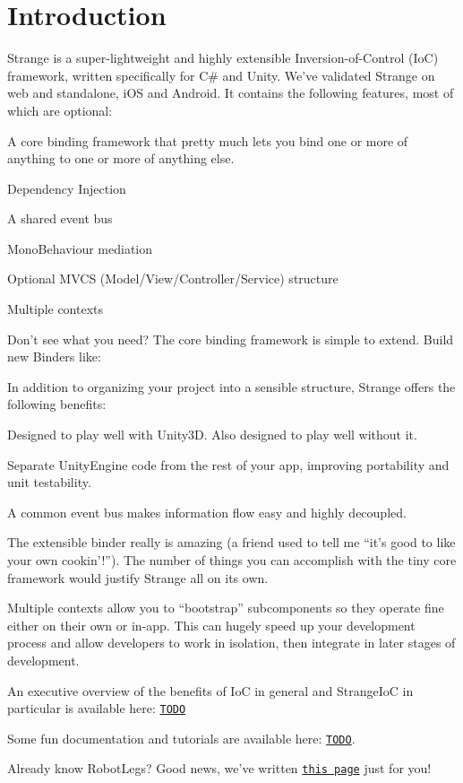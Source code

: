 \hypertarget{index_intro_sec}{}\section{Introduction}\label{index_intro_sec}
Strange is a super-\/lightweight and highly extensible Inversion-\/of-\/\-Control (Io\-C) framework, written specifically for C\# and Unity. We’ve validated Strange on web and standalone, i\-O\-S and Android. It contains the following features, most of which are optional\-: 
\begin{DoxyItemize}
\item A core binding framework that pretty much lets you bind one or more of anything to one or more of anything else. 
\item Dependency Injection 
\item A shared event bus 
\item Mono\-Behaviour mediation 
\item Optional M\-V\-C\-S (Model/\-View/\-Controller/\-Service) structure 
\item Multiple contexts 
\item Don’t see what you need? The core binding framework is simple to extend. Build new Binders like\-: 
\end{DoxyItemize}In addition to organizing your project into a sensible structure, Strange offers the following benefits\-: 
\begin{DoxyItemize}
\item Designed to play well with Unity3\-D. Also designed to play well without it. 
\item Separate Unity\-Engine code from the rest of your app, improving portability and unit testability. 
\item A common event bus makes information flow easy and highly decoupled. 
\item The extensible binder really is amazing (a friend used to tell me “it’s good to like your own cookin’!”). The number of things you can accomplish with the tiny core framework would justify Strange all on its own. 
\item Multiple contexts allow you to “bootstrap” subcomponents so they operate fine either on their own or in-\/app. This can hugely speed up your development process and allow developers to work in isolation, then integrate in later stages of development. 
\end{DoxyItemize}An executive overview of the benefits of Io\-C in general and Strange\-Io\-C in particular is available here\-: \href{}{\tt T\-O\-D\-O} \par
 Some fun documentation and tutorials are available here\-: \href{}{\tt T\-O\-D\-O}. \par
 Already know Robot\-Legs? Good news, we've written \href{}{\tt this page} just for you! 